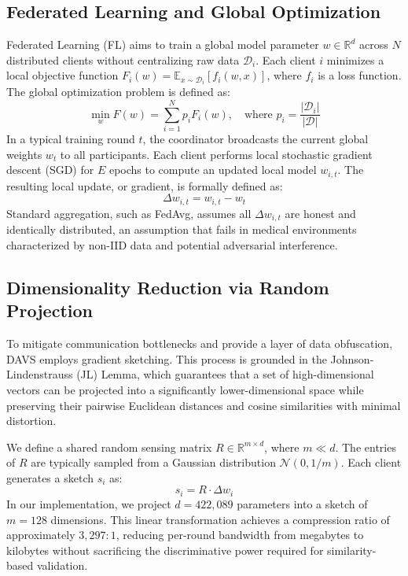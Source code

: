 \documentclass[conference]{IEEEtran}
\begin{document}
\subsection{Federated Learning and Global Optimization}
Federated Learning (FL) aims to train a global model parameter $w \in \mathbb{R}^d$ across $N$ distributed clients without centralizing raw data $\mathcal{D}_i$. Each client $i$ minimizes a local objective function $F_i(w) = \mathbb{E}_{x \sim \mathcal{D}_i} [f_i(w, x)]$, where $f_i$ is a loss function. The global optimization problem is defined as:
\begin{equation}
    \min_{w} F(w) = \sum_{i=1}^{N} p_i F_i(w), \quad \text{where } p_i = \frac{|\mathcal{D}_i|}{|\mathcal{D}|}
\end{equation}
In a typical training round $t$, the coordinator broadcasts the current global weights $w_t$ to all participants. Each client performs local stochastic gradient descent (SGD) for $E$ epochs to compute an updated local model $w_{i,t}$. The resulting local update, or gradient, is formally defined as:
\begin{equation}
    \Delta w_{i,t} = w_{i,t} - w_t
\end{equation}
Standard aggregation, such as FedAvg, assumes all $\Delta w_{i,t}$ are honest and identically distributed, an assumption that fails in medical environments characterized by non-IID data and potential adversarial interference.

\subsection{Dimensionality Reduction via Random Projection}
To mitigate communication bottlenecks and provide a layer of data obfuscation, DAVS employs gradient sketching. This process is grounded in the Johnson-Lindenstrauss (JL) Lemma, which guarantees that a set of high-dimensional vectors can be projected into a significantly lower-dimensional space while preserving their pairwise Euclidean distances and cosine similarities with minimal distortion. 

We define a shared random sensing matrix $R \in \mathbb{R}^{m \times d}$, where $m \ll d$. The entries of $R$ are typically sampled from a Gaussian distribution $\mathcal{N}(0, 1/m)$. Each client generates a sketch $s_i$ as:
\begin{equation}
    s_i = R \cdot \Delta w_i
\end{equation}
In our implementation, we project $d = 422{,}089$ parameters into a sketch of $m = 128$ dimensions. This linear transformation achieves a compression ratio of approximately $3{,}297{:}1$, reducing per-round bandwidth from megabytes to kilobytes without sacrificing the discriminative power required for similarity-based validation.
\end{document}
